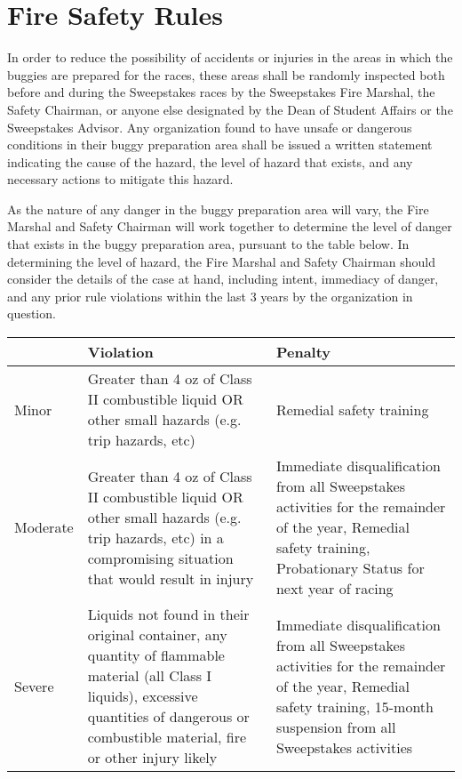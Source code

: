 \section{Fire Safety Rules}


In order to reduce the possibility of accidents or injuries in the areas in which the buggies are prepared for the races, these areas shall be randomly inspected both before and during the Sweepstakes races by the Sweepstakes Fire Marshal, the Safety Chairman, or anyone else designated by the Dean of Student Affairs or the Sweepstakes Advisor.  Any organization found to have unsafe or dangerous conditions in their buggy preparation area shall be issued a written statement indicating the cause of the hazard, the level of hazard that exists, and any necessary actions to mitigate this hazard.

As the nature of any danger in the buggy preparation area will vary, the Fire Marshal and Safety Chairman will work together to determine the level of danger that exists in the buggy preparation area, pursuant to the table below. In determining the level of hazard, the Fire Marshal and Safety Chairman should consider the details of the case at hand, including intent, immediacy of danger, and any prior rule violations within the last 3 years by the organization in question.

\begin{table}[h]
\begin{tabular}{|p{2cm}|p{5cm}|p{5cm}|}
  \hline
  & Violation & Penalty \\
  \hline
  Minor & Greater than  4 oz of  Class II combustible liquid OR other small hazards (e.g. trip hazards, etc) & Remedial safety training \\
  \hline
  Moderate & Greater than  4 oz of  Class II combustible liquid OR other small hazards (e.g. trip hazards, etc) in a compromising situation that would result in injury & Immediate disqualification from all Sweepstakes activities for the remainder of the year, Remedial safety training, Probationary Status for next year of racing \\
  \hline
  Severe & Liquids not found in their original container, any quantity of flammable material (all Class I liquids), excessive quantities of dangerous or combustible material,  fire or other injury likely & Immediate disqualification from all Sweepstakes activities for the remainder of the year, Remedial safety training, 15-month suspension from all Sweepstakes activities \\
  \hline
\end{tabular}
\end{table}


